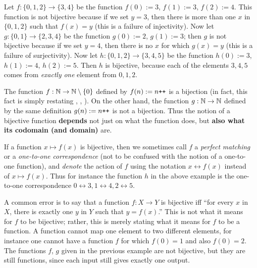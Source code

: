 \begin{example} \label{example 3.3.21}
Let \(f : \{0, 1, 2\} \rightarrow \{3, 4\} \) be the function \(f(0) := 3\), \(f(1) := 3\), \(f(2) := 4\). This function is not bijective because if we set \(y = 3\), then there is more than one \(x\) in \( \{0, 1, 2 \} \) such that \(f(x) = y\) (this is a failure of injectivity). Now let \(g : \{0, 1\} \rightarrow \{2, 3, 4\} \) be the function \(g(0) := 2\), \(g(1) := 3\); then \(g\) is not bijective because if we set \(y = 4\), then there is no \(x\) for which \(g(x) = y\) (this is a failure of surjectivity). Now let \(h : \{0, 1, 2\} \rightarrow \{3, 4, 5\} \) be the function \(h(0) := 3\), \(h(1) := 4\), \(h(2) := 5\). Then \(h\) is bijective, because each of the elements \(3, 4, 5\) comes from \emph{exactly one} element from \(0, 1, 2\).
\end{example}

\begin{example} \label{example 3.3.22}
The function \(f : \mathbb{N} \rightarrow \mathbb{N} \setminus \{0\} \) defined by \(f(n) := n\texttt{++}\) is a bijection (in fact, this fact is simply restating , , ). On the other hand, the function \(g : \mathbb{N} \rightarrow \mathbb{N}\) defined by the same definition \(g(n) := n\texttt{++}\) is not a bijection. Thus the notion of a bijective function \textbf{depends} not just on what the function does, but \textbf{also what its codomain (and domain)} are.
\end{example}

\begin{remark} \label{remark 3.3.23}
If a function \(x \mapsto f(x)\) is bijective, then we sometimes call \(f\) a \emph{perfect matching} or a \emph{one-to-one correspondence} (not to be confused with the notion of a one-to-one function), and \emph{denote} the action of \(f\) using the notation \(x \leftrightarrow f(x)\) instead of \(x \mapsto f(x)\). Thus for instance the function \(h\) in the above example is the one-to-one correspondence \(0 \leftrightarrow 3, 1 \leftrightarrow 4, 2 \leftrightarrow 5\).
\end{remark}

\begin{remark} \label{remark 3.3.24}
A common error is to say that a function \(f : X \rightarrow Y\) is bijective iff ``for every \(x\) in \(X\), there is exactly one \(y\) in \(Y\) such that \(y = f(x)\).'' This is not what it means for \(f\) to be bijective; rather, this is merely stating what it means for \(f\) to be a function. A function cannot map one element to two different elements, for instance one cannot have a function \(f\) for which \(f(0) = 1\) and also \(f(0) = 2\). The functions \(f\), \(g\) given in the previous example are not bijective, but they are still functions, since each input still gives exactly one output.
\end{remark}

